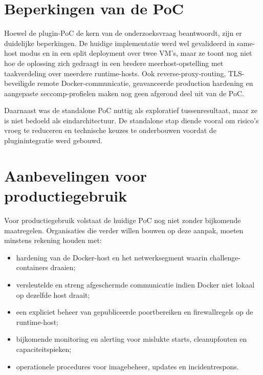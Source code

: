 \section{Beperkingen van de PoC}%
\label{sec:conclusie-beperkingen}

Hoewel de plugin-PoC de kern van de onderzoeksvraag beantwoordt, zijn er duidelijke beperkingen. De huidige implementatie werd wel gevalideerd in same-host modus en in een split deployment over twee VM's, maar ze toont nog niet hoe de oplossing zich gedraagt in een bredere meerhost-opstelling met taakverdeling over meerdere runtime-hosts. Ook reverse-proxy-routing, TLS-beveiligde remote Docker-communicatie, geavanceerde production hardening en aangepaste seccomp-profielen maken nog geen afgerond deel uit van de PoC.

Daarnaast was de standalone PoC nuttig als exploratief tussenresultaat, maar ze is niet bedoeld als eindarchitectuur. De standalone stap diende vooral om risico's vroeg te reduceren en technische keuzes te onderbouwen voordat de pluginintegratie werd gebouwd.

\section{Aanbevelingen voor productiegebruik}%
\label{sec:conclusie-aanbevelingen}

Voor productiegebruik volstaat de huidige PoC nog niet zonder bijkomende maatregelen. Organisaties die verder willen bouwen op deze aanpak, moeten minstens rekening houden met:

\begin{itemize}
  \item hardening van de Docker-host en het netwerksegment waarin challenge-containers draaien;
  \item versleutelde en streng afgeschermde communicatie indien Docker niet lokaal op dezelfde host draait;
  \item een expliciet beheer van gepubliceerde poortbereiken en firewallregels op de runtime-host;
  \item bijkomende monitoring en alerting voor mislukte starts, cleanupfouten en capaciteitspieken;
  \item operationele procedures voor imagebeheer, updates en incidentrespons.
\end{itemize}

